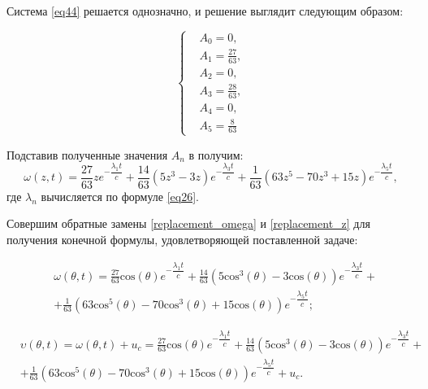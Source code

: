 {{    Система \eqref{eq44} решается однозначно, и решение выглядит следующим образом:
    
    \begin{equation}
    \left\{
    \begin{split}
     &A_0 = 0, \\
     &A_1 = \frac{27}{63}, \\
     &A_2 = 0, \\
     &A_3 = \frac{28}{63}, \\
     &A_4 = 0, \\
     &A_5 = \frac{8}{63}
    \end{split}
    \right.
    \end{equation} 
    
    Подставив полученные значения $A_n$ в  получим:
    \begin{equation}
        \omega(z,t) = \frac{27}{63}ze^{- \dfrac{\lambda_1 t}{c}} + \frac{14}{63}(5z^3-3z)e^{- \dfrac{\lambda_3 t}{c}} + 
        \frac{1}{63}(63z^5-70z^3+15z)e^{- \dfrac{\lambda_5 t}{c}},
    \end{equation}
    где $\lambda_n$ вычисляется по формуле \eqref{eq26}.
    
        
        Совершим обратные замены \eqref{replacement_omega} и \eqref{replacement_z} для получения конечной формулы, удовлетворяющей поставленной задаче:
        
        \begin{align*}
       &\omega(\theta,t) = \frac{27}{63}\text{cos}(\theta)e^{- \dfrac{\lambda_1 t}{c}} + \frac{14}{63}(5\text{cos}^3(\theta)-3\text{cos}(\theta))e^{- \dfrac{\lambda_3 t}{c}} + \\
         &+ \frac{1}{63}(63\text{cos}^5(\theta)-70\text{cos}^3(\theta)+15\text{cos}(\theta))e^{- \dfrac{\lambda_5 t}{c}};
    \end{align*}
    
    \begin{align}\label{series_posoha}
    &\upsilon(\theta, t) = \omega(\theta, t) + u_c = 
         \frac{27}{63}\text{cos}(\theta)e^{- \dfrac{\lambda_1 t}{c}} + \frac{14}{63}(5\text{cos}^3(\theta)-3\text{cos}			(\theta))e^{- \dfrac{\lambda_3 t}{c}} + \nonumber\\
        & + \frac{1}{63}(63\text{cos}^5(\theta)-70\text{cos}^3(\theta)+15\text{cos}(\theta))e^{- \dfrac{\lambda_5 t}{c}} 			+ u_c.
    \end{align}
    
}}
